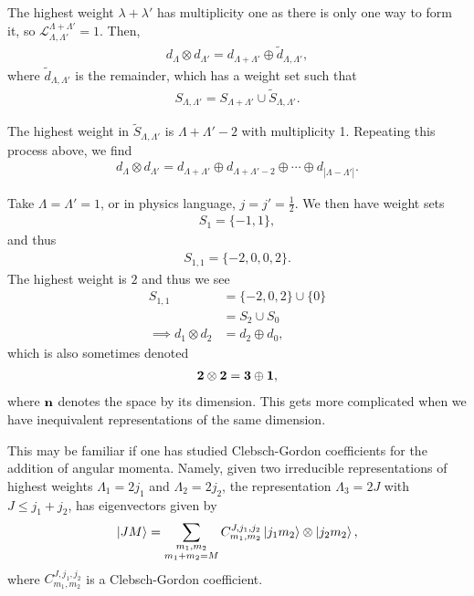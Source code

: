 
The highest weight $\lambda + \lambda'$ has multiplicity one as there is only one way to form it, so $\mathscr{L}_{\Lambda, \Lambda'}^{\Lambda + \Lambda'} = 1$. Then,
\begin{align}
    d_{\Lambda} \otimes d_{\Lambda'} = d_{\Lambda + \Lambda'} \oplus \widetilde{d}_{\Lambda, \Lambda'}
,\end{align}
where $\widetilde{d}_{\Lambda, \Lambda'}$ is the remainder, which has a weight set such that
\begin{align}
    S_{\Lambda, \Lambda'} = S_{\Lambda + \Lambda' } \cup \widetilde{S}_{\Lambda,\Lambda'}
.\end{align}

The highest weight in $\widetilde{S}_{\Lambda, \Lambda'}$ is $\Lambda + \Lambda' - 2$ with multiplicity 1. Repeating this process above, we find
\begin{align}
    d_{\Lambda} \otimes d_{\Lambda'} = d_{\Lambda + \Lambda'} \oplus d_{\Lambda + \Lambda' - 2} \oplus \cdots \oplus d_{\left| \Lambda - \Lambda' \right| }
.\end{align}

\begin{example}
    Take $\Lambda = \Lambda' = 1$, or in physics language, $j = j' = \frac{1}{2}$. We then have weight sets
    \begin{align}
        S_1 = \{-1,1\} 
    ,\end{align}
    and thus
    \begin{align}
        S_{1,1} = \{-2,0,0,2\} 
    .\end{align}
    The highest weight is $2$ and thus we see
    \begin{align}
        S_{1,1} &= \{-2,0,2\} \cup \{0\}\\
        &= S_2 \cup S_0 \\
        \implies d_1 \otimes d_2 &= d_2 \oplus d_0
    ,\end{align}
    which is also sometimes denoted
    \begin{align}
        \vb{2} \otimes \vb{2} = \vb{3} \oplus \vb{1}
    ,\end{align}
    where $\vb{n}$ denotes the space by its dimension. This gets more complicated when we have inequivalent representations of the same dimension.
\end{example}

This may be familiar if one has studied Clebsch-Gordon coefficients for the addition of angular momenta. Namely, given two irreducible representations of highest weights $\Lambda_1 = 2j_1$ and $\Lambda_2 = 2j_2$, the representation $\Lambda_3 = 2 J$ with $J \leq j_1 + j_2$, has eigenvectors given by
\begin{align}
    \ket{JM} = \sum_{\substack{m_1,m_2\\m_1 + m_2 = M}}  C_{m_1, m_2}^{J, j_1, j_2}\ket{j_1 m_2} \otimes \ket{j_2 m_2}
,\end{align}
where $C_{m_1, m_2}^{J, j_1, j_2}$ is a Clebsch-Gordon coefficient.

